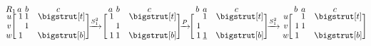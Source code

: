 \documentclass[sn-mathphys]{sn-jnl}
\begin{document}
$$
	\def\rowsp{0.2em}
	\def\arraystretch{0.95}
	\makeatletter\setlength\BA@colsep{1.2pt}\makeatother
	\begin{blockarray}{cccc}{R_1}
	 \kern-0.2em  \vspace{-0.3em} & a & b & c  \\
		\begin{block}{c[ccc]}
  		u \kern\rowsp  & \; 1 & 1 &  \hphantom{1} \; \topstrut \\
  		v \kern\rowsp & \;  & 1 &  \hphantom{1} \; \\
  		w \kern\rowsp & \; 1 &  &  \hphantom{1} \; \botstrut \\  
		\end{block}
	\end{blockarray}
	\xrightarrow{S_{1}^2} 
	\begin{blockarray}{cccc}{}
	\kern-0.2em \vspace{-0.3em} & a & b & c  \\
		\begin{block}{c[ccc]}
  		 & \; 1 &  &  \hphantom{1} \; \topstrut \\
  		 & \;  & 1 &  \hphantom{1} \; \\
  		 & \; 1 & 1 & \hphantom{1} \; \botstrut \\
		\end{block}
	\end{blockarray}
		\xrightarrow{P}
	\hspace{-0.2em}
	\begin{blockarray}{cccc}{}
	\kern-0.2em \vspace{-0.3em} & b & a & c  \\
		\begin{block}{c[ccc]}
  		& \;  & 1 &  \hphantom{1} \; \topstrut \\
  		& \; 1 &  &  \hphantom{1} \; \\
  		& \; 1 & \underline{1} &  \hphantom{1} \; \botstrut \\
		\end{block}
	\end{blockarray}
	\xrightarrow{S_1^2}
	\hspace{-0.1em}
	\begin{blockarray}{cccc}{}
	\kern-0.2em \vspace{-0.3em} & b & a & c  \\
		\begin{block}{c[ccc]}
  		u \kern\rowsp & \;  & 1 &  \hphantom{1} \; \topstrut \\
  		v \kern\rowsp & \; 1 & 1 &  \hphantom{1} \; \\
  		w \kern\rowsp & \; 1 &  &  \hphantom{1} \; \botstrut \\
		\end{block}
	\end{blockarray}
$$
\end{document}
